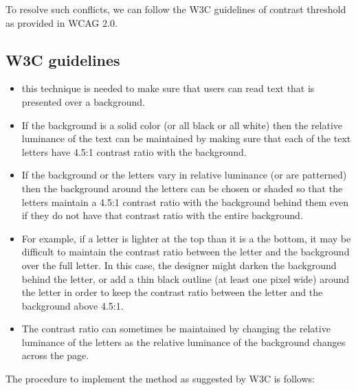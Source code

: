 To resolve such conflicts, we can follow the W3C guidelines of contrast threshold as provided in WCAG 2.0. 

\subsection{W3C guidelines} %
\label{W3C guidelines}

\begin{itemize}
\item{}this technique is needed to make sure that users can read text that is presented over a background. 

\item{}If the background is a solid color (or all black or all white) then the relative luminance of the text can be maintained by making sure that each of the text letters have 4.5:1 contrast ratio with the background.

\item{}If the background or the letters vary in relative luminance (or are patterned) then the background around the letters can be chosen or shaded so that the letters maintain a 4.5:1 contrast ratio with the background behind them even if they do not have that contrast ratio with the entire background.

\item{}For example, if a letter is lighter at the top than it is a the bottom, it may be difficult to maintain the contrast ratio between the letter and the background over the full letter. In this case, the designer might darken the background behind the letter, or add a thin black outline (at least one pixel wide) around the letter in order to keep the contrast ratio between the letter and the background above 4.5:1.

\item{}The contrast ratio can sometimes be maintained by changing the relative luminance of the letters as the relative luminance of the background changes across the page.

\end{itemize}

The procedure to implement the method as suggested by W3C is follows:


